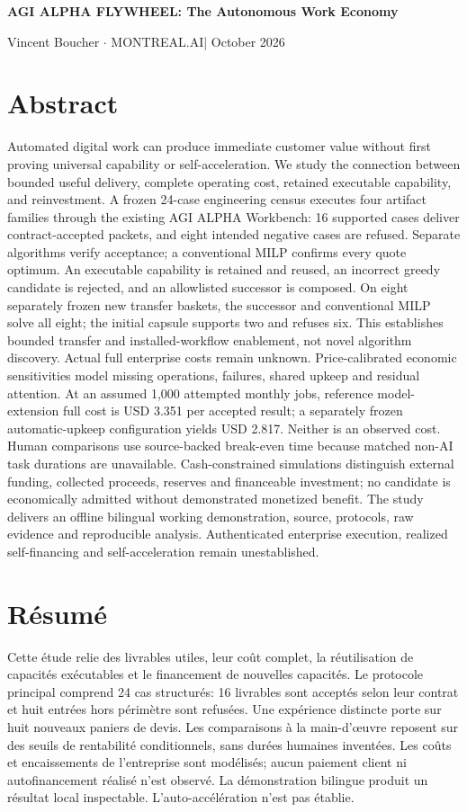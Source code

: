 \hypersetup{pageanchor=true}
\setcounter{page}{1}
\begin{center}{\Large\bfseries AGI ALPHA FLYWHEEL: The Autonomous Work Economy}\par
\small Vincent Boucher $\cdot$ MONTREAL.AI\quad | October 2026
\end{center}
\section*{Abstract}
Automated digital work can produce immediate customer value without first proving universal capability or self-acceleration. We study the connection between bounded useful delivery, complete operating cost, retained executable capability, and reinvestment. A frozen 24-case engineering census executes four artifact families through the existing AGI ALPHA Workbench: 16 supported cases deliver contract-accepted packets, and eight intended negative cases are refused. Separate algorithms verify acceptance; a conventional MILP confirms every quote optimum. An executable capability is retained and reused, an incorrect greedy candidate is rejected, and an allowlisted successor is composed. On eight separately frozen new transfer baskets, the successor and conventional MILP solve all eight; the initial capsule supports two and refuses six. This establishes bounded transfer and installed-workflow enablement, not novel algorithm discovery. Actual full enterprise costs remain unknown. Price-calibrated economic sensitivities model missing operations, failures, shared upkeep and residual attention. At an assumed 1,000 attempted monthly jobs, reference model-extension full cost is USD 3.351 per accepted result; a separately frozen automatic-upkeep configuration yields USD 2.817. Neither is an observed cost. Human comparisons use source-backed break-even time because matched non-AI task durations are unavailable. Cash-constrained simulations distinguish external funding, collected proceeds, reserves and financeable investment; no candidate is economically admitted without demonstrated monetized benefit. The study delivers an offline bilingual working demonstration, source, protocols, raw evidence and reproducible analysis. Authenticated enterprise execution, realized self-financing and self-acceleration remain unestablished.

\section*{R\'esum\'e}
Cette \'etude relie des livrables utiles, leur co\^ut complet, la r\'eutilisation de capacit\'es ex\'ecutables et le financement de nouvelles capacit\'es. Le protocole principal comprend 24 cas structur\'es: 16 livrables sont accept\'es selon leur contrat et huit entr\'ees hors p\'erim\`etre sont refus\'ees. Une exp\'erience distincte porte sur huit nouveaux paniers de devis. Les comparaisons \`a la main-d'\oe uvre reposent sur des seuils de rentabilit\'e conditionnels, sans dur\'ees humaines invent\'ees. Les co\^uts et encaissements de l'entreprise sont mod\'elis\'es; aucun paiement client ni autofinancement r\'ealis\'e n'est observ\'e. La d\'emonstration bilingue produit un r\'esultat local inspectable. L'auto-acc\'el\'eration n'est pas \'etablie.

